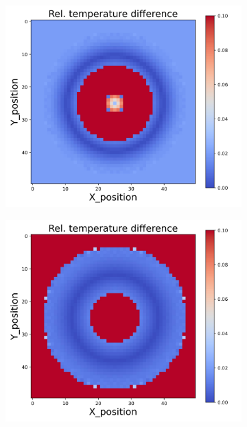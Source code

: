{\begin{figure}[h]
\begin{minipage}{\textwidth}
\begin{subfigure}{0.27\textwidth}
        \end{subfigure}
    \end{minipage}\\
    \begin{minipage}{\textwidth}
        \centering
        \begin{subfigure}{0.27\textwidth}
            \centering
            \includegraphics[width=\textwidth]{figures/raw_data/25/quad/T_bias.jpg}
        \end{subfigure}
        \begin{subfigure}{0.27\textwidth}
            \centering
            \includegraphics[width=\textwidth]{figures/raw_data/26/quad/T_bias.jpg}

\end{subfigure}
\end{minipage}
\end{figure}}
